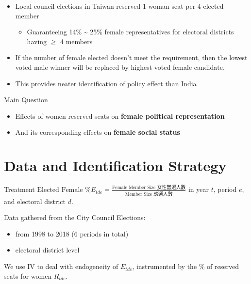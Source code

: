 \documentclass[
  10pt,
  ignorenonframetext,
  aspectratio=43,
]{beamer}
\providecommand{\tightlist}{%
  \setlength{\itemsep}{0pt}\setlength{\parskip}{0pt}}
\begin{document}
\begin{frame}
\begin{itemize}
\tightlist
\item
  Local council elections in Taiwan reserved 1 woman seat per 4 elected
  member

  \begin{itemize}
  \tightlist
  \item
    Guaranteeing 14\% \textasciitilde{} 25\% female representatives for
    electoral districts having \(\geq\) 4 members
  \end{itemize}
\item
  If the number of female elected doesn't meet the requirement, then the
  lowest voted male winner will be replaced by highest voted female
  candidate.
\item
  This provides neater identification of policy effect than India
\end{itemize}
\end{frame}

\begin{frame}{Main Question}
\protect\hypertarget{main-question}{}
\begin{itemize}
\tightlist
\item
  Effects of women reserved seats on \textbf{female political
  representation}
\item
  And its corresponding effects on \textbf{female social status}
\end{itemize}
\end{frame}

\hypertarget{data-and-identification-strategy}{%
\section{Data and Identification
Strategy}\label{data-and-identification-strategy}}

\begin{frame}{Treatment}
\protect\hypertarget{treatment}{}
\(\text{Elected Female \% } E_{tde} = \frac{\text{Female Member Size 女性當選人數}}{\text{Member Size 應選人數}}\)
in year \(t\), period \(e\), and electoral district \(d\).

Data gathered from the City Council Elections:

\begin{itemize}
\tightlist
\item
  from 1998 to 2018 (6 periods in total)
\item
  electoral district level
\end{itemize}

We use IV to deal with endogeneity of \(E_{tde}\), instrumented by the
\% of reserved seats for women \(R_{tde}\).
\end{frame}
\end{document}

